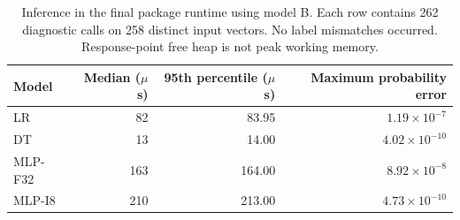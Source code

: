 \begin{table}[!htbp]
\caption{Inference in the final package runtime using model B. Each row contains 262 diagnostic calls on 258 distinct input vectors. No label mismatches occurred. Response-point free heap is not peak working memory.}\label{tab:inference-hardware}
\centering\small
\begin{tabular}{lrrr}
\toprule Model & Median ($\mu$s) & 95th percentile ($\mu$s) & Maximum probability error\\\midrule
LR & 82 & 83.95 & $1.19\times 10^{-7}$\\
DT & 13 & 14.00 & $4.02\times 10^{-10}$\\
MLP-F32 & 163 & 164.00 & $8.92\times 10^{-8}$\\
MLP-I8 & 210 & 213.00 & $4.73\times 10^{-10}$\\
\bottomrule\end{tabular}\end{table}
